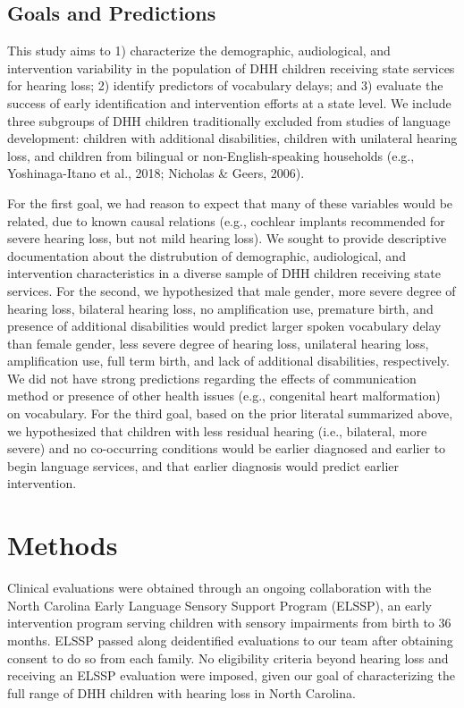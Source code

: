 \documentclass[english,man]{apa6}
\begin{document}
\hypertarget{goals-and-predictions}{%
\subsection{Goals and Predictions}\label{goals-and-predictions}}

This study aims to 1) characterize the demographic, audiological, and intervention variability in the population of DHH children receiving state services for hearing loss; 2) identify predictors of vocabulary delays; and 3) evaluate the success of early identification and intervention efforts at a state level. We include three subgroups of DHH children traditionally excluded from studies of language development: children with additional disabilities, children with unilateral hearing loss, and children from bilingual or non-English-speaking households (e.g., Yoshinaga-Itano et al., 2018; Nicholas \& Geers, 2006).

For the first goal, we had reason to expect that many of these variables would be related, due to known causal relations (e.g., cochlear implants recommended for severe hearing loss, but not mild hearing loss). We sought to provide descriptive documentation about the distrubution of demographic, audiological, and intervention characteristics in a diverse sample of DHH children receiving state services. For the second, we hypothesized that male gender, more severe degree of hearing loss, bilateral hearing loss, no amplification use, premature birth, and presence of additional disabilities would predict larger spoken vocabulary delay than female gender, less severe degree of hearing loss, unilateral hearing loss, amplification use, full term birth, and lack of additional disabilities, respectively. We did not have strong predictions regarding the effects of communication method or presence of other health issues (e.g., congenital heart malformation) on vocabulary. For the third goal, based on the prior literatal summarized above, we hypothesized that children with less residual hearing (i.e., bilateral, more severe) and no co-occurring conditions would be earlier diagnosed and earlier to begin language services, and that earlier diagnosis would predict earlier intervention.

\hypertarget{methods}{%
\section{Methods}\label{methods}}

Clinical evaluations were obtained through an ongoing collaboration with the North Carolina Early Language Sensory Support Program (ELSSP), an early intervention program serving children with sensory impairments from birth to 36 months. ELSSP passed along deidentified evaluations to our team after obtaining consent to do so from each family. No eligibility criteria beyond hearing loss and receiving an ELSSP evaluation were imposed, given our goal of characterizing the full range of DHH children with hearing loss in North Carolina.
\end{document}
